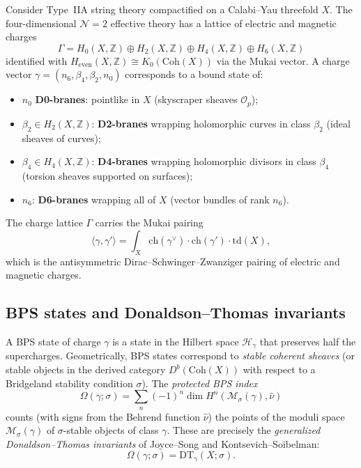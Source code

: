 \documentclass[11pt]{article}
\theoremstyle{definition}
\newcommand{\Coh}{\mathrm{Coh}}
\newcommand{\DT}{\mathrm{DT}}
\newcommand{\ch}{\mathrm{ch}}
\newcommand{\td}{\mathrm{td}}
\newcommand{\cO}{\mathcal{O}}
\newcommand{\cM}{\mathcal{M}}
\newcommand{\bZ}{\mathbb{Z}}
\begin{document}
Consider Type~IIA string theory compactified on a Calabi--Yau
threefold $X$. The four-dimensional $\mathcal{N}=2$ effective theory
has a lattice of electric and magnetic charges
\[
 \Gamma = H_0(X,\bZ) \oplus H_2(X,\bZ) \oplus H_4(X,\bZ) \oplus
 H_6(X,\bZ)
\]
identified with $H_{\mathrm{even}}(X, \bZ) \cong K_0(\Coh(X))$ via
the Mukai vector. A charge vector $\gamma = (n_6, \beta_4, \beta_2,
n_0)$ corresponds to a bound state of:
\begin{itemize}[nosep]
 \item $n_0$ \textbf{D0-branes}: pointlike in $X$ (skyscraper
 sheaves $\cO_p$);
 \item $\beta_2 \in H_2(X,\bZ)$: \textbf{D2-branes} wrapping
 holomorphic curves in class $\beta_2$ (ideal sheaves of curves);
 \item $\beta_4 \in H_4(X,\bZ)$: \textbf{D4-branes} wrapping
 holomorphic divisors in class $\beta_4$ (torsion sheaves
 supported on surfaces);
 \item $n_6$: \textbf{D6-branes} wrapping all of $X$ (vector
 bundles of rank $n_6$).
\end{itemize}
The charge lattice $\Gamma$ carries the Mukai pairing
\[
 \langle \gamma, \gamma' \rangle
 = \int_X \ch(\gamma^\vee) \cdot \ch(\gamma') \cdot \td(X),
\]
which is the antisymmetric Dirac--Schwinger--Zwanziger pairing of electric
and magnetic charges.

\subsection{BPS states and Donaldson--Thomas invariants}

A BPS state of charge $\gamma$ is a state in the Hilbert space
$\mathcal{H}_\gamma$ that preserves half the supercharges.
Geometrically, BPS states correspond to \emph{stable coherent sheaves}
(or stable objects in the derived category $D^b(\Coh(X))$ with
respect to a Bridgeland stability condition $\sigma$). The
\emph{protected BPS index}
\[
 \Omega(\gamma; \sigma) = \sum_n (-1)^n \dim H^n(\cM_\sigma(\gamma),
 \hat{\nu})
\]
counts (with signs from the Behrend function $\hat{\nu}$) the points
of the moduli space $\cM_\sigma(\gamma)$ of $\sigma$-stable objects of
class $\gamma$. These are precisely the \emph{generalized
Donaldson--Thomas invariants} of Joyce--Song and
Kontsevich--Soibelman:
\begin{equation}
\label{eq:bps-dt}
 \boxed{\Omega(\gamma; \sigma) = \DT_\gamma(X; \sigma).}
\end{equation}
\end{document}
